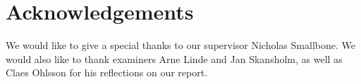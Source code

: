 \thispagestyle{plain}
\section*{Acknowledgements}
We would like to give a special thanks to our supervisor Nicholas Smallbone. We would also like to thank examiners Arne Linde and Jan Skansholm, as well as Claes Ohlsson for his reflections on our report.

\newpage
\thispagestyle{empty}
\mbox{}
